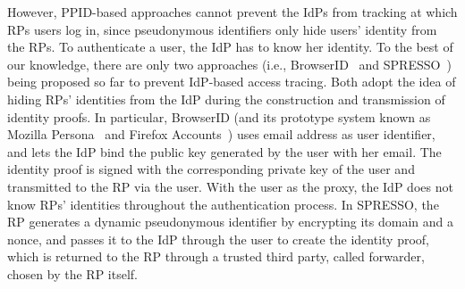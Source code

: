 
However, PPID-based approaches cannot prevent the IdPs from tracking at which RPs users log in, since pseudonymous identifiers only hide users' identity from the RPs. To authenticate a user, the IdP has to know her identity. To the best of our knowledge, there are only two approaches (i.e., BrowserID~\cite{BrowserID} and SPRESSO~\cite{SPRESSO}) being proposed so far to prevent IdP-based access tracing. Both adopt the idea of hiding RPs' identities from the IdP during the construction and transmission of identity proofs. In particular, BrowserID (and its prototype system known as Mozilla Persona~\cite{persona} and Firefox Accounts~\cite{FirefoxAccount}) uses email address as user identifier, and lets the IdP bind the public key generated by the user with her email. The identity proof is signed with the corresponding private key of the user and transmitted to the RP via the user. With the user as the proxy, the IdP does not know RPs' identities throughout the authentication process. In SPRESSO, the RP generates a dynamic pseudonymous identifier by encrypting its domain and a nonce, and passes it to the IdP through the user to create the identity proof, which is returned to the RP through a trusted third party, called forwarder, chosen by the RP itself.




